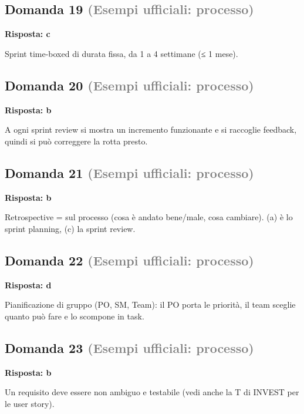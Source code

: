 \documentclass[a4paper,11pt]{article}
\begin{document}
\subsection*{Domanda 19 \hfill {\small \textcolor{gray}{(Esempi ufficiali: processo)}}}
\textbf{Risposta: c}\par
Sprint time-boxed di durata fissa, da 1 a 4 settimane (≤ 1 mese).



\subsection*{Domanda 20 \hfill {\small \textcolor{gray}{(Esempi ufficiali: processo)}}}
\textbf{Risposta: b}\par
A ogni sprint review si mostra un incremento funzionante e si raccoglie feedback, quindi si può correggere la rotta presto.



\subsection*{Domanda 21 \hfill {\small \textcolor{gray}{(Esempi ufficiali: processo)}}}
\textbf{Risposta: b}\par
Retrospective = sul processo (cosa è andato bene/male, cosa cambiare). (a) è lo sprint planning, (c) la sprint review.



\subsection*{Domanda 22 \hfill {\small \textcolor{gray}{(Esempi ufficiali: processo)}}}
\textbf{Risposta: d}\par
Pianificazione di gruppo (PO, SM, Team): il PO porta le priorità, il team sceglie quanto può fare e lo scompone in task.



\subsection*{Domanda 23 \hfill {\small \textcolor{gray}{(Esempi ufficiali: processo)}}}
\textbf{Risposta: b}\par
Un requisito deve essere non ambiguo e testabile (vedi anche la T di INVEST per le user story).
\end{document}
